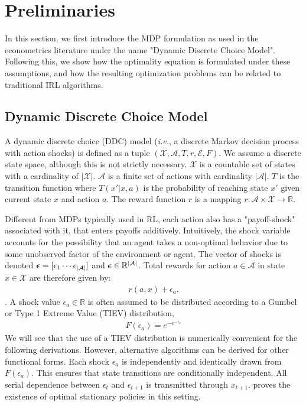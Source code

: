 \documentclass{article}
\renewcommand{\vec}[1]{\mbox{\bm{$#1$}}}
\begin{document}
\section{Preliminaries}

In this section, we first introduce the MDP formulation as used in the econometrics literature under the name "Dynamic Discrete Choice Model". Following this, we show how the optimality equation is formulated under these assumptions, and how the resulting optimization problems can be related to traditional IRL algorithms.

\subsection{Dynamic Discrete Choice Model}

A dynamic discrete choice (DDC) model (\emph{i.e.}, a discrete Markov decision process with action shocks) is defined as a tuple $(\mathcal{X,A}, T,r,\mathcal{E},F)$. 
We assume a discrete state space, although this is not strictly necessary.
$\mathcal{X}$ is a countable set of states with a cardinality of $|\mathcal{X}|$. $\mathcal{A}$ is a finite set of actions with cardinality $|\mathcal{A}|$. $T$ is the transition function where $T(x'|x,a)$ is the probability of reaching state $x'$ given current state $x$ and action $a$. The reward function $r$ is a mapping $r:\mathcal{A}\times\mathcal{X}\rightarrow \mathbb{R}$.

Different from MDPs typically used in RL, each action also has a "payoff-shock" associated with it, that enters payoffs additively.
Intuitively, the shock variable accounts for the possibility that an agent takes a non-optimal behavior due to some unobserved factor of the environment or agent.
The vector of shocks is denoted $\vec{\epsilon} = [ \epsilon_{1} \cdots \epsilon_{|\mathcal{A}|} ]$ and $\vec{\epsilon}\in \mathbb{R}^{|\mathcal{A}|}$. Total rewards for action $a \in \mathcal{A}$ in state $x \in \mathcal{X}$ are therefore given by:
\begin{eqnarray}
r(a,x)+\epsilon_a.
\end{eqnarray}
. A shock value $\epsilon_a\in\mathbb{R}$ is often assumed to be distributed according to a Gumbel or Type 1 Extreme Value (TIEV) distribution,
\begin{align}
F(\epsilon_a)=e^{-e^{-\epsilon_a}}
\end{align}
We will see that the use of a TIEV distribution is numerically convenient for the following derivations. However, alternative algorithms can be derived for other functional forms. Each shock $\epsilon_a$ is independently and identically drawn from $F(\epsilon_a)$. This ensures that state transitions are conditionally independent. All serial dependence between $\epsilon_{t}$ and $\epsilon_{t+1}$ is transmitted through $x_{t+1}$. \cite{rust_theory} proves the existence of optimal stationary policies in this setting.
\end{document}
